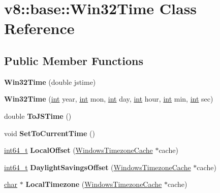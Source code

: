 \hypertarget{classv8_1_1base_1_1Win32Time}{}\section{v8\+:\+:base\+:\+:Win32\+Time Class Reference}
\label{classv8_1_1base_1_1Win32Time}
\subsection*{Public Member Functions}
\begin{DoxyCompactItemize}
\item 
\mbox{\label{classv8_1_1base_1_1Win32Time_a9f8e83cbab5a3d25b11cf4371305faf8}} 
{\bfseries Win32\+Time} (double jstime)
\item 
\mbox{\label{classv8_1_1base_1_1Win32Time_a189fecfc6a50f0932db3b0e025f84665}} 
{\bfseries Win32\+Time} (\mbox{\hyperlink{classint}{int}} year, \mbox{\hyperlink{classint}{int}} mon, \mbox{\hyperlink{classint}{int}} day, \mbox{\hyperlink{classint}{int}} hour, \mbox{\hyperlink{classint}{int}} min, \mbox{\hyperlink{classint}{int}} sec)
\item 
\mbox{\label{classv8_1_1base_1_1Win32Time_a052f87c337e9d06abe156757e01c4a09}} 
double {\bfseries To\+J\+S\+Time} ()
\item 
\mbox{\label{classv8_1_1base_1_1Win32Time_ab6f3f19dd6479e7286e3d5b9e0089b34}} 
void {\bfseries Set\+To\+Current\+Time} ()
\item 
\mbox{\label{classv8_1_1base_1_1Win32Time_a48be11d8082ffc4e8fee9b72f17cfe05}} 
\mbox{\hyperlink{classint64__t}{int64\+\_\+t}} {\bfseries Local\+Offset} (\mbox{\hyperlink{classv8_1_1base_1_1WindowsTimezoneCache}{Windows\+Timezone\+Cache}} $\ast$cache)
\item 
\mbox{\label{classv8_1_1base_1_1Win32Time_a9a92308daaf1301f88d967a46fd2b9d7}} 
\mbox{\hyperlink{classint64__t}{int64\+\_\+t}} {\bfseries Daylight\+Savings\+Offset} (\mbox{\hyperlink{classv8_1_1base_1_1WindowsTimezoneCache}{Windows\+Timezone\+Cache}} $\ast$cache)
\item 
\mbox{\label{classv8_1_1base_1_1Win32Time_ac457756f879b8e9cbdb78cb9c9d7c79e}} 
\mbox{\hyperlink{classchar}{char}} $\ast$ {\bfseries Local\+Timezone} (\mbox{\hyperlink{classv8_1_1base_1_1WindowsTimezoneCache}{Windows\+Timezone\+Cache}} $\ast$cache)
\end{DoxyCompactItemize}


